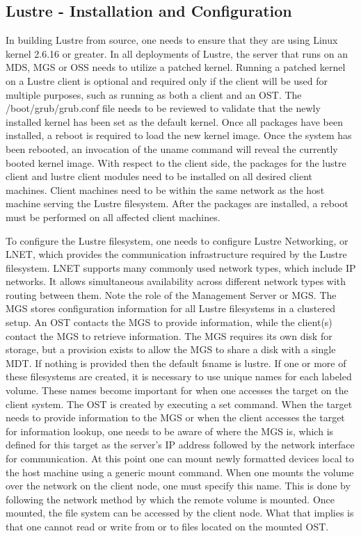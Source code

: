 \documentclass[11pt]{article}
\begin{document}
\subsection{Lustre - Installation and Configuration}

In building Lustre from source, one needs to ensure that they are using 
Linux kernel 2.6.16 or greater. In all deployments of Lustre, the server 
that runs on an MDS, MGS or OSS needs to utilize a patched kernel. 
Running a patched kernel on a Lustre client is optional and required only 
if the client will be used for multiple purposes, such as running as both 
a client and an OST. The /boot/grub/grub.conf file needs to be reviewed 
to validate that the newly installed kernel has been set as the default 
kernel. Once all packages have been installed, a reboot is required to 
load the new kernel image. Once the system has been rebooted, an invocation 
of the uname command will reveal the currently booted kernel image. With 
respect to the client side, the packages for the lustre client and lustre 
client modules need to be installed on all desired client machines. Client 
machines need to be within the same network as the host machine serving the 
Lustre filesystem. After the packages are installed, a reboot must be 
performed on all affected client machines.

To configure the Lustre filesystem, one needs to configure Lustre Networking, 
or LNET, which provides the communication infrastructure required by the 
Lustre filesystem. LNET supports many commonly used network types, which 
include IP  networks. It allows simultaneous availability across different 
network types with routing between them. Note the role of the Management 
Server or MGS. The MGS stores configuration information for all Lustre 
filesystems in a clustered setup. An OST contacts the MGS to provide 
information, while the client(s) contact the MGS to retrieve information. 
The MGS requires its own disk for storage, but a provision exists to allow 
the MGS to share a disk with a single MDT. If nothing is provided then the 
default fsname is lustre. If one or more of these filesystems are created, 
it is necessary to use unique names for each labeled volume. These names 
become important for when one accesses the target on the client system.
The OST is created by executing a set command. When the target needs to 
provide information to the MGS or when the client accesses the target for 
information lookup, one needs to be aware of where the MGS is, which is 
defined for this target as the server's IP address followed by the network 
interface for communication. At this point one can mount newly formatted 
devices local to the host machine using a generic mount command. When one 
mounts the volume over the network on the client node, one must specify 
this name. This is done by following the network method by which the 
remote volume is mounted. Once mounted, the file system can be accessed 
by the client node. What that implies is that one cannot read or write from 
or to files located on the mounted OST. 
\end{document}

